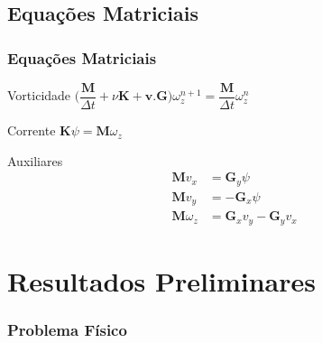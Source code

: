 \documentclass{beamer}
\begin{document}
\subsection{Equações Matriciais}
\begin{frame}
  \frametitle{Equações Matriciais}
  \begin{block}{Vorticidade}
    \centering
    $\bigg(\dfrac{\mathbf{M}}{\Delta t} + \nu \mathbf{K} + \mathbf{v.G} \bigg)\omega_z^{n+1} = \dfrac{\mathbf{M}}{\Delta t} \omega_z^n$
  \end{block}

  \begin{block}{Corrente}
    \centering
    $\mathbf{K} \psi = \mathbf{M} \omega_z$
  \end{block}
  
  \begin{block}{Auxiliares}
    \vspace*{-\baselineskip}\setlength\belowdisplayshortskip{0pt} %
    \centering
    \begin{align*}
      \mathbf{M} v_x &= \mathbf{G}_y \psi \\
      \mathbf{M} v_y &=-\mathbf{G}_x \psi \\
      \mathbf{M} \omega_z &= \mathbf{G}_x v_y - \mathbf{G}_y v_x
    \end{align*}
  \end{block}
\end{frame}

\section{Resultados Preliminares}

\begin{frame}
  \frametitle{Problema Físico}
\end{frame}

\end{document}

